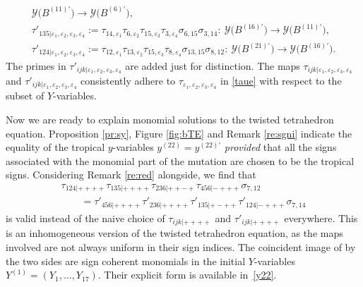 \documentclass[11pt]{article}
\numberwithin{equation}{section}
\newcommand\bY{Y}
\numberwithin{equation}{section}
\begin{document}
\begin{gather*}
 \mathcal{Y}\bigl(B^{(11)\prime}\bigr) \rightarrow \mathcal{Y}\bigl(B^{(6)\prime}\bigr),
\\
\tau'_{135 | \varepsilon_1,\varepsilon_2,\varepsilon_3,\varepsilon_4} :=
\tau_{14,\varepsilon_1}\tau_{6,\varepsilon_2}\tau_{15,\varepsilon_3}\tau_{3,\varepsilon_4}\sigma_{6,15}\sigma_{3,14}\colon\
 \mathcal{Y}\bigl(B^{(16)\prime}\bigr) \rightarrow \mathcal{Y}\bigl(B^{(11)\prime}\bigr),
\\
\tau'_{124 | \varepsilon_1,\varepsilon_2,\varepsilon_3,\varepsilon_4} :=
\tau_{12,\varepsilon_1}\tau_{13,\varepsilon_2}\tau_{15,\varepsilon_3}\tau_{8,\varepsilon_4}\sigma_{13,15}\sigma_{8,12}\colon\
 \mathcal{Y}\bigl(B^{(21)\prime}\bigr) \rightarrow \mathcal{Y}\bigl(B^{(16)\prime}\bigr).
\end{gather*}
The primes in $\tau'_{\!ijk | \varepsilon_1,\varepsilon_2,\varepsilon_3,\varepsilon_4}$
are added just for distinction.
The maps $\tau_{\!ijk | \varepsilon_1,\varepsilon_2,\varepsilon_3,\varepsilon_4}$ and
$\tau'_{\!ijk | \varepsilon_1,\varepsilon_2,\varepsilon_3,\varepsilon_4}$
consistently adhere to $\tau_{\varepsilon_1,\varepsilon_2,\varepsilon_3,\varepsilon_4}$ in
\eqref{taue} with respect to the subset of $Y$-variables.

Now we are ready to explain monomial solutions to the twisted tetrahedron equation.
Proposition \ref{pr:sy}, Figure \ref{fig:bTE} and Remark \ref{re:sgni} indicate
the equality of the tropical $y$-variables $y^{(22)} = y^{(22)\prime}$ {\em provided} that
all the signs associated with the monomial part of the mutation are chosen to be the tropical signs.
Considering Remark \ref{re:red} alongside, we find that
\begin{gather}
\tau_{124| + + + +} \tau_{135| + + + +}\tau_{236| + + - +}\tau_{456| - + + +}\sigma_{7,12}\nonumber\\
\qquad
=
\tau'_{456| + + + +}\tau'_{236| + + + +}\tau'_{135| + - + +}\tau'_{124| - + + +}\sigma_{7,14}\label{ihte}
\end{gather}
is valid instead of the naive choice of $\tau_{ijk| ++++}$ and $\tau'_{ijk| ++++}$ everywhere.
This is an inhomogeneous version of the twisted tetrahedron equation,
as the maps involved are not always uniform in their sign indices.
%
The coincident image of \smash{$Y^{(22)}_1, \dots, Y^{(22)}_{17}$} by the
two sides are sign coherent monomials in the initial $Y$-variables
$\bY^{(1)} = (Y_1,\dotsc, Y_{17})$. Their explicit form is available
in~\eqref{y22}.
\end{document}
